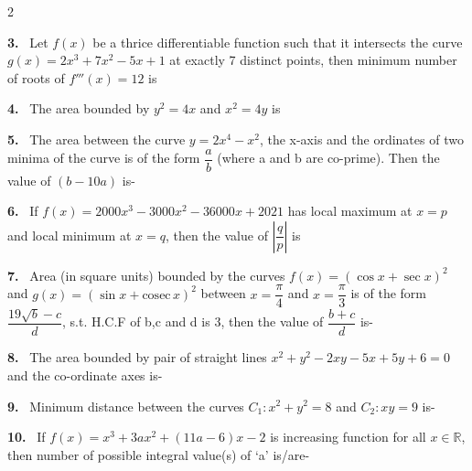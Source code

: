 \documentclass[10pt]{extarticle}
\newcommand{\qn}[1]{\par\smallskip\noindent\textbf{#1.}~}
\begin{document}
\begin{multicols}{2}
\qn{3} Let $f(x)$ be a thrice differentiable function such that it intersects the curve $g(x)=2x^3+7x^2-5x+1$ at exactly 7 distinct points, then minimum number of roots of $f'''(x)=12$ is
\qn{4} The area bounded by $y^2=4x$ and $x^2=4y$ is
\qn{5} The area between the curve $y=2x^4-x^2$, the x-axis and the ordinates of two minima of the curve is of the form $\dfrac{a}{b}$ (where a and b are co-prime). Then the value of $(b-10a)$ is-
\qn{6} If $f(x)=2000x^3-3000x^2-36000x+2021$ has local maximum at $x=p$ and local minimum at $x=q$, then the value of $\left|\dfrac{q}{p}\right|$ is
\qn{7} Area (in square units) bounded by the curves $f(x)=(\cos x+\sec x)^2$ and $g(x)=(\sin x+\mathrm{cosec}\,x)^2$ between $x=\dfrac{\pi}{4}$ and $x=\dfrac{\pi}{3}$ is of the form $\dfrac{19\sqrt{b}-c}{d}$, s.t. H.C.F of b,c and d is 3, then the value of $\dfrac{b+c}{d}$ is-
\qn{8} The area bounded by pair of straight lines $x^2+y^2-2xy-5x+5y+6=0$ and the co-ordinate axes is-
\qn{9} Minimum distance between the curves $C_1: x^2+y^2=8$ and $C_2: xy=9$ is-
\qn{10} If $f(x)=x^3+3ax^2+(11a-6)x-2$ is increasing function for all $x\in\mathbb{R}$, then number of possible integral value(s) of `a' is/are-
\end{multicols}
\end{document}
